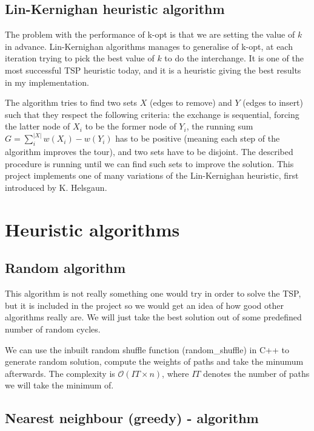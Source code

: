 \documentclass[12pt,twoside,notitlepage]{report}
\begin{document}
\subsection{Lin-Kernighan heuristic algorithm}

The problem with the performance of k-opt is that we are setting the value of $k$ in advance. Lin-Kernighan algorithms manages to generalise of k-opt, at each iteration trying to pick the best value of $k$ to do the interchange. It is one of the most successful TSP heuristic today, and it is a heuristic giving the best results in my implementation.

The algorithm tries to find two sets $X$ (edges to remove) and $Y$ (edges to insert) such that they respect the following criteria: the exchange is sequential, forcing the latter node of $X_i$ to be the former node of $Y_i$, the running sum $G = \sum_{i}^{|X|} w(X_i) - w(Y_i)$ has to be positive (meaning each step of the algorithm improves the tour), and two sets have to be disjoint. The described procedure is running until we can find such sets to improve the solution. This project implements one of many variations of the Lin-Kernighan heuristic, first introduced by K. Helsgaun\cite{Helsgaun_2000}. 

\section{Heuristic algorithms}

\subsection{Random algorithm}

This algorithm is not really something one would try in order to solve the TSP, but it is included in the project so we would get an idea of how good other algorithms really are. We will just take the best solution out of some predefined number of random cycles.

We can use the inbuilt random shuffle function (random\_shuffle) in C++ to generate random solution, compute the weights of paths and take the minumum afterwards. The complexity is $\mathcal{O}(IT \times n)$, where $IT$ denotes the number of paths we will take the minimum of.

\subsection{Nearest neighbour (greedy) - algorithm}
\end{document}
